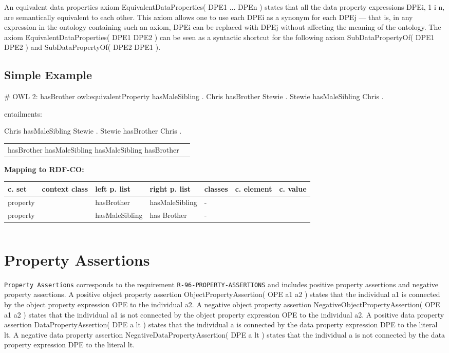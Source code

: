 \documentclass{llncs}
\newcommand{\ms}[1]{\texttt{#1}}
\newenvironment{gcotable}{
  \scriptsize
  \sffamily
  \vspace{0cm}
	\begin{center}
	\textbf{\vspace{0.4cm}Mapping to RDF-CO:} \\
  \begin{tabular}{l|l|l|l|l|l|l}
	\hline
  \textbf{c. set} & \textbf{context class} & \textbf{left p. list} & \textbf{right p. list} & \textbf{classes} & \textbf{c. element} & \textbf{c. value} \\
  \hline

}{
  \hline
  \end{tabular}
	\end{center}
}
\newenvironment{DL}{
\vspace{0cm}
	\begin{center}
  \begin{tabular}{r l}

}{
  \end{tabular}
	\end{center}
}
\begin{document}
An equivalent data properties axiom EquivalentDataProperties( DPE1 ... DPEn ) states that all the data property expressions DPEi, 1  i  n, are semantically equivalent to each other. This axiom allows one to use each DPEi as a synonym for each DPEj — that is, in any expression in the ontology containing such an axiom, DPEi can be replaced with DPEj without affecting the meaning of the ontology. The axiom EquivalentDataProperties( DPE1 DPE2 ) can be seen as a syntactic shortcut for the following axiom SubDataPropertyOf( DPE1 DPE2 ) and SubDataPropertyOf( DPE2 DPE1 ).

\subsection{Simple Example}

\begin{ex}
# OWL 2:
hasBrother owl:equivalentProperty hasMaleSibling . 
Chris hasBrother Stewie . 
Stewie hasMaleSibling Chris .
\end{ex}

entailments:

\begin{ex}
Chris hasMaleSibling Stewie . 
Stewie hasBrother Chris .
\end{ex}

\begin{DL}
hasBrother  hasMaleSibling  hasMaleSibling  hasBrother \\
\end{DL}

\begin{gcotable}
property &  & hasBrother & hasMaleSibling & - &  \\
property &  & hasMaleSibling & has Brother & - &  \\
\end{gcotable}

\begin{DL}

\end{DL}

\section{Property Assertions}

\ms{{Property Assertions}} corresponds to the requirement \ms{R-96-PROPERTY-ASSERTIONS}
and includes positive property assertions and negative property assertions.
A positive object property assertion ObjectPropertyAssertion( OPE a1 a2 ) states that the individual a1 is connected by the object property expression OPE to the individual a2. 
A negative object property assertion NegativeObjectPropertyAssertion( OPE a1 a2 ) states that the individual a1 is not connected by the object property expression OPE to the individual a2. 
A positive data property assertion DataPropertyAssertion( DPE a lt ) states that the individual a is connected by the data property expression DPE to the literal lt. 
A negative data property assertion NegativeDataPropertyAssertion( DPE a lt ) states that the individual a is not connected by the data property expression DPE to the literal lt.
\end{document}
